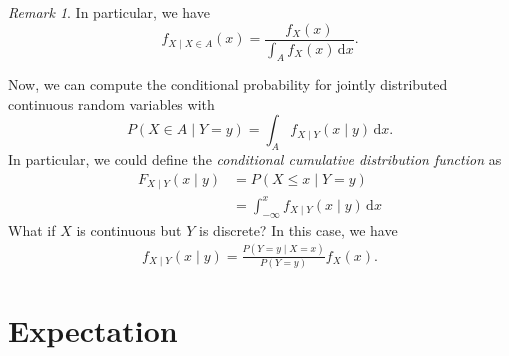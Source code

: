 \documentclass[math]{amznotes}
\theoremstyle{remark}
\newtheorem*{remark}{Remark}
\begin{document}
\begin{notebox}
    \begin{remark}
        In particular, we have
        \begin{equation*}
            f_{X \mid X \in A}(x) = \frac{f_X(x)}{\int_A\!f_X(x)\,\mathrm{d}x}.
        \end{equation*}
    \end{remark}
\end{notebox}
Now, we can compute the conditional probability for jointly distributed continuous random variables with
\begin{equation*}
    P(X \in A \mid Y = y) = \int_{A}\!f_{X \mid Y}(x \mid y)\,\mathrm{d}x.
\end{equation*}
In particular, we could define the \textit{conditional cumulative distribution function} as
\begin{align*}
    F_{X \mid Y}(x \mid y) & = P(X \leq x \mid Y = y) \\
    & = \int_{-\infty}^x\!f_{X \mid Y}(x \mid y)\,\mathrm{d}x
\end{align*}
What if $X$ is continuous but $Y$ is discrete? In this case, we have
\begin{align*}
    f_{X \mid Y}(x \mid y) = \frac{P(Y = y \mid X = x)}{P(Y = y)}f_X(x).
\end{align*}

\chapter{Expectation}
\end{document}

